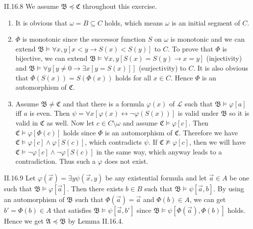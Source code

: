 \documentclass[12pt]{article}
\begin{document}
\begin{customthm}{II.16.8}
  We assume $\mathfrak{B}\preccurlyeq\mathfrak{C}$ throughout this exercise.
  \begin{enumerate}
    \item It is obvious that $\omega=B\subseteq C$ holds, which means $\omega$ is an initial segment of $C$.
    \item $\Phi$ is monotonic since the successor function $S$ on $\omega$ is monotonic and we can extend $\mathfrak{B}\models\forall x,y[x<y\rightarrow S(x)<S(y)]$ to $C$. To prove that $\Phi$ is bijective, we can extend $\mathfrak{B}\models\forall x,y[S(x)=S(y)\rightarrow x=y]$ (injectivity) and $\mathfrak{B}\models\forall y[y\neq 0\rightarrow\exists x[y=S(x)]]$ (surjectivity) to $C$. It is also obvious that $\Phi(S(x))=S(\Phi(x))$ holds for all $x\in C$. Hence $\Phi$ is an automorphism of $\mathfrak{C}$.
    \item Assume $\mathfrak{B}\neq\mathfrak{C}$ and that there is a formula $\varphi(x)$ of $\mathcal{L}$ such that $\mathfrak{B}\models\varphi[a]$ iff $a$ is even. Then  $\psi=\forall x[\varphi(x)\leftrightarrow\neg\varphi(S(x))]$ is valid under $\mathfrak{B}$ so it is valid in $\mathfrak{C}$ as well. Now let $c\in C\setminus\omega$ and assume $\mathfrak{C}\models\varphi[c]$. Then $\mathfrak{C}\models\varphi[\Phi(c)]$ holds since $\Phi$ is an automorphism of $\mathfrak{C}$. Therefore we have $\mathfrak{C}\models\varphi[c]\wedge\varphi[S(c)]$, which contradicts $\psi$. If $\mathfrak{C}\not\models\varphi[c]$, then we will have $\mathfrak{C}\models\neg\varphi[c]\wedge\neg\varphi[S(c)]$ in the same way, which anyway leads to a contradiction. Thus such a $\varphi$ does not exist.
  \end{enumerate}
\end{customthm}

\begin{customthm}{II.16.9}
  Let $\varphi(\vec{x})=\exists y\psi(\vec{x},y)$ be any existential formula and let $\vec{a}\in A$ be one such that $\mathfrak{B}\models\varphi[\vec{a}]$. Then there exists $b\in B$ such that $\mathfrak{B}\models\psi[\vec{a},b]$. By using an automorphism of $\mathfrak{B}$ such that $\Phi(\vec{a})=\vec{a}$ and $\Phi(b)\in A$, we can get $b'=\Phi(b)\in A$ that satisfies $\mathfrak{B}\models\psi[\vec{a},b']$ since $\mathfrak{B}\models\psi[\Phi(\vec{a}),\Phi(b)]$ holds. Hence we get $\mathfrak{A}\preccurlyeq\mathfrak{B}$ by Lemma II.16.4.
\end{customthm}
\end{document}
